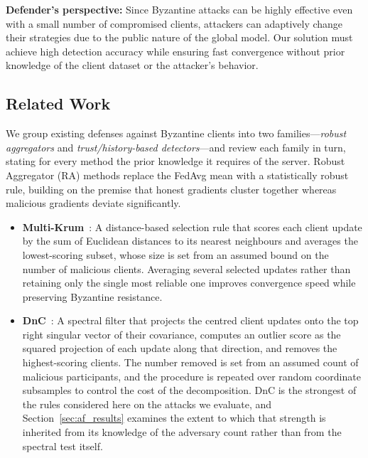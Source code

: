 \documentclass[journal]{IEEEtran}
\begin{document}
\noindent\textbf{Defender's perspective:} Since Byzantine attacks can be highly effective even with a small number of compromised clients, attackers can adaptively change their strategies due to the public nature of the global model. Our solution must achieve high detection accuracy while ensuring fast convergence without prior knowledge of the client dataset or the attacker's behavior.

\subsection{Related Work}

We group existing defenses against Byzantine clients into two families---\emph{robust aggregators} and \emph{trust/history-based detectors}---and review each family in turn, stating for every method the prior knowledge it requires of the server. Robust Aggregator (RA) methods replace the FedAvg mean with a statistically robust rule, building on the premise that honest gradients cluster together whereas malicious gradients deviate significantly.

\begin{itemize}
    \item \textbf{Multi-Krum}~\cite{blanchard2017machine}: A distance-based selection rule that scores each client update by the sum of Euclidean distances to its nearest neighbours and averages the lowest-scoring subset, whose size is set from an assumed bound on the number of malicious clients. Averaging several selected updates rather than retaining only the single most reliable one improves convergence speed while preserving Byzantine resistance.

    \item \textbf{DnC}~\cite{shejwalkar2021manipulating}: A spectral filter that projects the centred client updates onto the top right singular vector of their covariance, computes an outlier score as the squared projection of each update along that direction, and removes the highest-scoring clients. The number removed is set from an assumed count of malicious participants, and the procedure is repeated over random coordinate subsamples to control the cost of the decomposition. DnC is the strongest of the rules considered here on the attacks we evaluate, and Section~\ref{sec:af_results} examines the extent to which that strength is inherited from its knowledge of the adversary count rather than from the spectral test itself.
\end{itemize}
\end{document}
